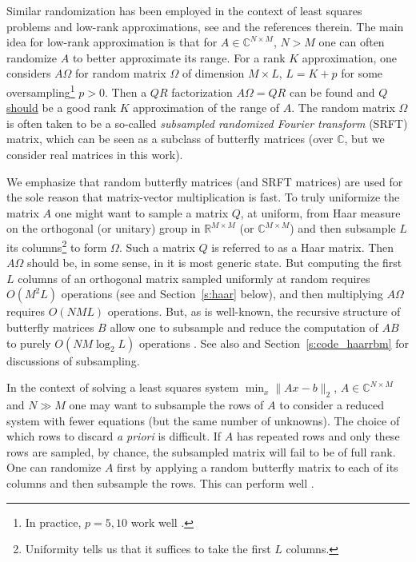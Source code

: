 Similar randomization has been employed in the context of least squares problems and low-rank approximations, see \cite{Avron2010,Halko2011,Liberty2007,Lerman2014} and the references therein.  The main idea for low-rank approximation is that for $A \in \mathbb C^{N \times M}$, $N > M$ one can often randomize $A$ to better approximate its range. For a rank $K$ approximation, one considers $A\Omega$ for random matrix $\Omega$ of dimension $M \times L$, $L = K + p$ for some oversampling\footnote{In practice, $p = 5,10$ work well \cite{Halko2011}.} $p > 0$.  Then a $QR$ factorization $A\Omega = QR$ can be found and $Q$ \underline{should} be a good rank $K$ approximation of the range of $A$.  The random matrix $\Omega$ is often taken to be a so-called \emph{subsampled randomized Fourier transform} (SRFT) matrix, which can be seen as a subclass of butterfly matrices (over $\mathbb C$, but we consider real matrices in this work).

We emphasize that random butterfly matrices (and SRFT matrices) are used for the sole reason that matrix-vector multiplication is fast.  To truly uniformize the matrix $A$ one might want to sample a matrix $Q$, at uniform, from Haar measure on the orthogonal (or unitary) group in $\mathbb R^{M \times M}$ (or $\mathbb C^{M \times M}$) and then subsample $L$ its columns\footnote{Uniformity tells us that it suffices to take the first $L$ columns.} to form $\Omega$. Such a matrix $Q$ is referred to as a Haar matrix. Then $A \Omega$ should be, in some sense, in it is most generic state.  But computing the first $L$ columns of an orthogonal matrix sampled uniformly at random requires $O(M^2 L)$ operations (see \cite{Stewart1980} and Section~\ref{s:haar} below), and then multiplying $A\Omega$ requires $O(NML)$ operations.  But, as is well-known, the recursive structure of butterfly matrices $B$ allow one to subsample and reduce the computation of $AB$ to purely $O(NM \log_2 L)$ operations \cite{Halko2011}.  See also \cite{Boutsidis2013,Tropp2011} and Section~\ref{s:code_haarrbm} for discussions of subsampling.    

In the context of solving a least squares system $\min_x \|Ax - b\|_2$, $A \in \mathbb C^{N \times M}$ and $N \gg M$ one may want to subsample the rows of $A$ to consider a reduced system with fewer equations (but the same number of unknowns).  The choice of which rows to discard \emph{a priori} is difficult.  If $A$ has repeated rows and only these rows are sampled, by chance, the subsampled matrix will fail to be of full rank.  One can randomize $A$ first by applying a random butterfly matrix to each of its columns and then subsample the rows.  This can perform well \cite{Avron2010}.

